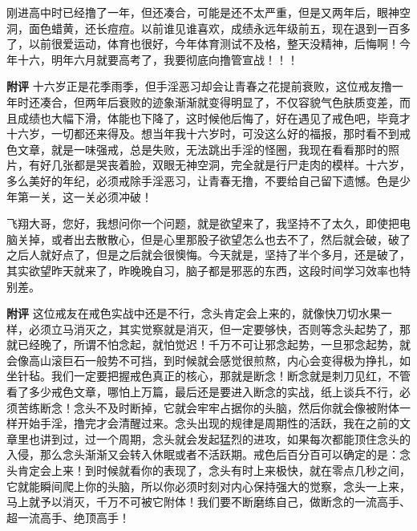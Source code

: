 \begin{case}
    刚进高中时已经撸了一年，但还凑合，可能是还不太严重，但是又两年后，眼神空洞，面色蜡黄，还长痘痘。以前谁见谁喜欢，成绩永远年级前五，现在退到一百多了，以前很爱运动，体育也很好，今年体育测试不及格，整天没精神，后悔啊！今年十六，明年六月就要高考了，我要彻底向撸管宣战！！！

    \textbf{附评} 十六岁正是花季雨季，但手淫恶习却会让青春之花提前衰败，这位戒友撸一年时还凑合，但两年后衰败的迹象渐渐就变得明显了，不仅容貌气色肤质变差，而且成绩也大幅下滑，体能也下降了，这时候他后悔了，好在遇见了戒色吧，毕竟才十六岁，一切都还来得及。想当年我十六岁时，可没这么好的福报，那时看不到戒色文章，就是一味强戒，总是失败，无法跳出手淫的怪圈，我现在看看那时的照片，有好几张都是哭丧着脸，双眼无神空洞，完全就是行尸走肉的模样。十六岁，多么美好的年纪，必须戒除手淫恶习，让青春无撸，不要给自己留下遗憾。色是少年第一关，这一关必须冲破！
\end{case}

\begin{case}
    飞翔大哥，您好，我想问你一个问题，就是欲望来了，我坚持不了太久，即使把电脑关掉，或者出去散散心，但是心里那股子欲望怎么也去不了，然后就会破，破了之后人就好点了，但是之后就会很懊悔。今天就是，坚持了半个多月，还是破了，其实欲望昨天就来了，昨晚晚自习，脑子都是邪恶的东西，这段时间学习效率也特别差。

    \textbf{附评} 这位戒友在戒色实战中还是不行，念头肯定会上来的，就像快刀切水果一样，必须立马消灭之，其实觉察就是消灭，但一定要够快，否则等念头起势了，那就已经晚了，所谓不怕念起，就怕觉迟！千万不可让邪念起势，一旦邪念起势，就会像高山滚巨石一般势不可挡，到时候就会感觉很煎熬，内心会变得极为挣扎，如坐针毡。我们一定要把握戒色真正的核心，那就是断念！断念就是刺刀见红，不管看了多少戒色文章，哪怕上万篇，最后还是要进入断念的实战，纸上谈兵不行，必须苦练断念！念头不及时断掉，它就会牢牢占据你的头脑，然后你就会像被附体一样开始手淫，撸完才会清醒过来。念头出现的规律是周期性的活跃，我在之前的文章里也讲到过，过一个周期，念头就会发起猛烈的进攻，如果每次都能顶住念头的入侵，那么念头渐渐又会转入休眠或者不活跃期。戒色后百分百可以确定的是：念头肯定会上来！到时候就看你的表现了，念头有时上来极快，就在零点几秒之间，它就能瞬间爬上你的头脑，所以你必须时刻对内心保持强大的觉察，念头一上来，马上就予以消灭，千万不可被它附体！我们要不断磨练自己，做断念的一流高手、超一流高手、绝顶高手！
\end{case}

